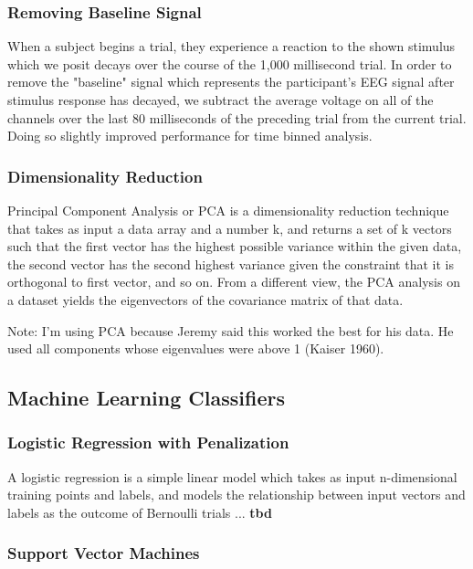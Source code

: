 \documentclass[11pt]{report}
\begin{document}
\subsubsection{Removing Baseline Signal}
	When a subject begins a trial, they experience a reaction to the shown stimulus which we posit decays over the course of the 1,000 millisecond trial.  In order to remove the "baseline" signal which represents the participant's EEG signal after stimulus response has decayed, we subtract the average voltage on all of the channels over the last 80 milliseconds of the preceding trial from the current trial.  Doing so slightly improved performance for time binned analysis.
	
\subsubsection{Dimensionality Reduction}
Principal Component Analysis or PCA is a dimensionality reduction technique that takes as input a data array and a number k, and returns a set of k vectors such that the first vector has the highest possible variance within the given data, the second vector has the second highest variance given the constraint that it is orthogonal to first vector, and so on.  From a different view, the PCA analysis on a dataset yields the eigenvectors of the covariance matrix of that data.

	Note: I'm using PCA because Jeremy said this worked the best for his data.  He used all components whose eigenvalues were above 1 (Kaiser 1960).

\subsection{Machine Learning Classifiers}
\subsubsection{Logistic Regression with Penalization}

A logistic regression is a simple linear model which takes as input n-dimensional training points and labels, and models the relationship between input vectors and labels as 	the outcome of Bernoulli trials ... {\bf tbd}

\subsubsection{Support Vector Machines}
\end{document}
